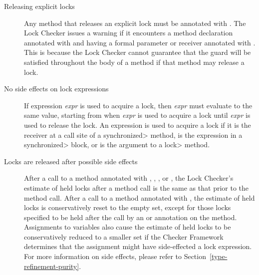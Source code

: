 \begin{description}

\item[Releasing explicit locks]
  Any method that releases an explicit lock must be annotated
  with .
  The Lock Checker issues a warning if it encounters a method declaration
  annotated with  and having a formal parameter
  or receiver annotated with .  This is because
  the Lock Checker cannot guarantee that the guard will be satisfied
  throughout the body of a method if that method may release a lock.

\item[No side effects on lock expressions]
  If expression \emph{expr} is used to acquire a lock, then
  \emph{expr} must evaluate to the same value, starting from when
  \emph{expr} is used to acquire a lock until \emph{expr} is used to
  release the lock.
  An expression is used to acquire a lock if it is the receiver at a
  call site of a \<synchronized> method, is the expression in a
  \<synchronized> block, or is the argument to a \<lock> method.

\item[Locks are released after possible side effects]
  After a call to a method annotated with ,
  , , or ,
  the Lock Checker's estimate of held locks
  after a method call is the same as that prior to the method call.
  After a call to a method annotated with ,
  the estimate of held locks is conservatively reset to the empty set,
  except for those locks specified to be held after the call
  by an  or 
  annotation on the method.  Assignments to variables also
  cause the estimate of held locks to be conservatively reduced
  to a smaller set if the Checker Framework determines that the
  assignment might have side-effected a lock expression.
  For more information on side effects, please refer to
  Section~\ref{type-refinement-purity}.

\end{description}



